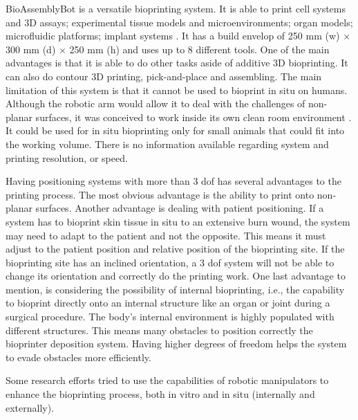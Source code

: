 BioAssemblyBot\textregistered{} is a versatile bioprinting system. It is able to print cell systems and 3D assays; experimental tissue models and microenvironments; organ models; microfluidic platforms; implant systems \cite{Advanced2020_bioassemblybot}. It has a build envelop of 250 mm (w) $\times$ 300 mm (d) $\times$ 250 mm (h) and uses up to 8 different tools. One of the main advantages is that it is able to do other tasks aside of additive 3D bioprinting. It can also do contour 3D printing, pick-and-place and assembling. The main limitation of this system is that it cannot be used to bioprint in situ on humans. Although the robotic arm would allow it to deal with the challenges of non-planar surfaces, it was conceived to work inside its own clean room environment \cite{Advanced2020_bioassemblybot}. It could be used for in situ bioprinting only for small animals that could fit into the working volume. There is no information available regarding system and printing resolution, or speed.

Having positioning systems with more than 3 \gls{dof} has several advantages to the printing process. The most obvious advantage is the ability to print onto non-planar surfaces. Another advantage is dealing with patient positioning. If a system has to bioprint skin tissue in situ to an extensive burn wound, the system may need to adapt to the patient and not the opposite. This means it must adjust to the patient position and relative position of the bioprinting site. If the bioprinting site has an inclined orientation, a 3 \gls{dof} system will not be able to change its orientation and correctly do the printing work. One last advantage to mention, is considering the possibility of internal bioprinting, i.e., the capability to bioprint directly onto an internal structure like an organ or joint during a surgical procedure. The body's internal environment is highly populated with different structures. This means many obstacles to position correctly the bioprinter deposition system. Having higher degrees of freedom helps the system to evade obstacles more efficiently.\bigskip

Some research efforts tried to use the capabilities of robotic manipulators to enhance the bioprinting process, both in vitro and in situ (internally and externally).

